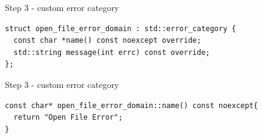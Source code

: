 \documentclass[10pt]{beamer}
\begin{document}
\begin{frame}[fragile]{Step 3 - custom error category}
	
	\begin{verbatim}
struct open_file_error_domain : std::error_category {
  const char *name() const noexcept override;		
  std::string message(int errc) const override;
};
	\end{verbatim}
\end{frame}

\begin{frame}[fragile]{Step 3 - custom error category}
\begin{verbatim}
const char* open_file_error_domain::name() const noexcept{
  return "Open File Error";
}
\end{verbatim}
\end{frame}
\end{document}
